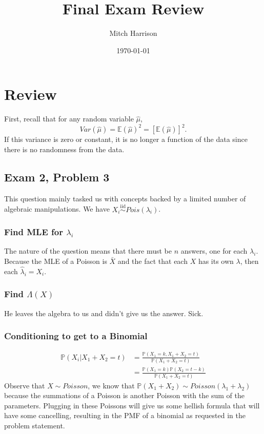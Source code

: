 \documentclass[titlepage, 12pt, leqno]{article}
\title{\Huge{Final Exam Review}}
\author{\large{Mitch Harrison}}
\date{\today}
\begin{document}
\setlength{\parskip}{1\baselineskip}
\setlength{\parindent}{15pt}
\maketitle
\tableofcontents
\newpage


\section{Review}

First, recall that for any random variable $\hat \mu$,
\[
    Var(\hat \mu) = \mathbb{E}(\hat \mu)^{2} = [\mathbb{E}(\hat \mu)]^{2}.
\]
If this variance is zero or constant, it is no longer a function of the data
since there is no randomness from the data.

\subsection{Exam 2, Problem 3}

This question mainly tasked us with concepts backed by a limited number of 
algebraic manipulations. We have $X_{i} \overset{\mathrm{iid}}{\sim}
Pois(\lambda_{i})$.

\subsubsection{Find MLE for $\lambda_{i}$}
The nature of the question means that there must be $n$ answers, one for each
$\lambda_{i}$. Because the MLE of a Poisson is $\bar X$ and the fact that each
$X$ has its own $\lambda$, then each $\hat \lambda_{i} = X_{i}$.

\subsubsection{Find $\Lambda(X)$}
He leaves the algebra to us and didn't give us the answer. Sick.

\subsubsection{Conditioning to get to a Binomial}
\begin{align*}
    \mathbb{P}(X_{i}|X_{1} + X_{2} = t)
    &= \frac{\mathbb{P}(X_{1} = k, X_{1} + X_{2}=t)}{
    \mathbb{P}(X_{1} + X_{2} = t)} \\
    &= \frac{\mathbb{P}(X_{1} = k)\mathbb{P}(X_{2}=t-k)}{
    \mathbb{P}(X_{1} +X_{2}=t)}
\end{align*}
Observe that $X \sim Poisson$, we know that $\mathbb{P}(X_{1} + X_{2})
\sim Poisson(\lambda_{1} + \lambda_{2})$ because the summations of a
Poisson is another Poisson with the sum of the parameters. Plugging in these
Poissons will give us some hellish formula that will have some cancelling,
resulting in the PMF of a binomial as requested in the problem statement.
\end{document}
